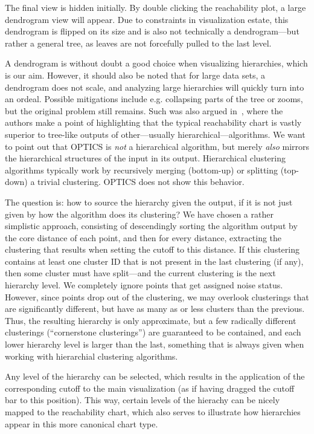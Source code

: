 \documentclass{vgtc}                          %
\begin{document}
The final view is hidden initially. By double clicking the reachability plot, a
large dendrogram view will appear. Due to constraints in visualization estate,
this dendrogram is flipped on its size and is also not technically a dendrogram---but
rather a general tree, as leaves are not forcefully pulled to the last level.

A dendrogram is without doubt a good choice when visualizing hierarchies, which
is our aim. However, it should also be noted that for large data sets, a
dendrogram does not scale, and analyzing large hierarchies will quickly turn
into an ordeal.  Possible mitigations include e.g. collapsing parts of the tree
or zooms, but the original problem still remains. Such was also argued
in~\cite{optics}, where the authors make a point of highlighting that the
typical reachability chart is vastly superior to tree-like outputs of
other---usually hierarchical---algorithms. We want to point out that OPTICS is
\emph{not} a hierarchical algorithm, but merely \emph{also} mirrors the
hierarchical structures of the input in its output. Hierarchical clustering
algorithms typically work by recursively merging (bottom-up) or splitting
(top-down) a trivial clustering.  OPTICS does not show this behavior.

The question is: how to source the hierarchy given the output, if it is not
just given by how the algorithm does its clustering? We have chosen a rather
simplistic approach, consisting of descendingly sorting the algorithm output by
the core distance of each point, and then for every distance, extracting the
clustering that results when setting the cutoff to this distance. If this
clustering contains at least one cluster ID that is not present in the last
clustering (if any), then some cluster must have split---and the current
clustering is the next hierarchy level.  We completely ignore points that get
assigned noise status.  However, since points drop out of the clustering, we
may overlook clusterings that are significantly different, but have as many as
or less clusters than the previous. Thus, the resulting hierarchy is only
approximate, but a few radically different clusterings (``cornerstone
clusterings'') are guaranteed to be contained, and each lower hierarchy level
is larger than the last, something that is always given when working with
hierarchial clustering algorithms.

Any level of the hierarchy can be selected, which results in the application of
the corresponding cutoff to the main visualization (as if having dragged the
cutoff bar to this position). This way, certain levels of the hierachy can be
nicely mapped to the reachability chart, which also serves to illustrate how
hierarchies appear in this more canonical chart type.
\end{document}
